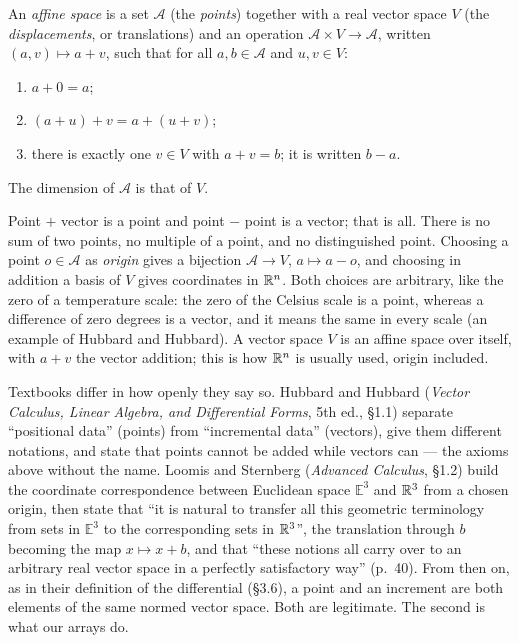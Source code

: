 \begin{notechapter}
\begin{definition}\label{gradient-tangent-space:def:affine}
An \emph{affine space} is a set $\mathcal A$ (the \emph{points}) together with a real vector space $V$ (the
\emph{displacements}, or translations) and an operation $\mathcal A\times V\to\mathcal A$, written $(a, v)\mapsto a + v$,
such that for all $a, b\in\mathcal A$ and $u, v\in V$:
\begin{enumerate}[nosep]
  \item $a + 0 = a$;
  \item $(a + u) + v = a + (u + v)$;
  \item there is exactly one $v\in V$ with $a + v = b$; it is written $b - a$.
\end{enumerate}
The dimension of $\mathcal A$ is that of $V$.
\end{definition}

Point $+$ vector is a point and point $-$ point is a vector; that is all. There is no sum of two
points, no multiple of a point, and no distinguished point. Choosing a point $o\in\mathcal A$ as
\emph{origin} gives a bijection $\mathcal A\to V$, $a\mapsto a - o$, and choosing in addition a basis of $V$ gives
coordinates in $\mathbb{R}^n$. Both choices are arbitrary, like the zero of a temperature scale: the zero
of the Celsius scale is a point, whereas a difference of zero degrees is a vector, and it means the
same in every scale (an example of Hubbard and Hubbard). A vector space $V$ is an affine space over itself, with $a + v$ the vector
addition; this is how $\mathbb{R}^n$ is usually used, origin included.

Textbooks differ in how openly they say so. Hubbard and Hubbard (\emph{Vector Calculus, Linear
Algebra, and Differential Forms}, 5th ed., §1.1) separate ``positional data'' (points) from
``incremental data'' (vectors), give them different notations, and state that points cannot be
added while vectors can --- the axioms above without the name. Loomis and Sternberg
(\emph{Advanced Calculus}, §1.2) build the coordinate correspondence between Euclidean space $\mathbb E^3$
and $\mathbb{R}^3$ from a chosen origin, then state that ``it is natural to transfer all this geometric
terminology from sets in $\mathbb E^3$ to the corresponding sets in $\mathbb{R}^3$'', the translation through $b$
becoming the map $x\mapsto x + b$, and that ``these notions all carry over to an arbitrary real vector
space in a perfectly satisfactory way'' (p.~40). From then on, as in their definition of the
differential (§3.6), a point and an increment are both elements of the same normed vector space. Both are legitimate. The second is what our arrays do.


\end{notechapter}
